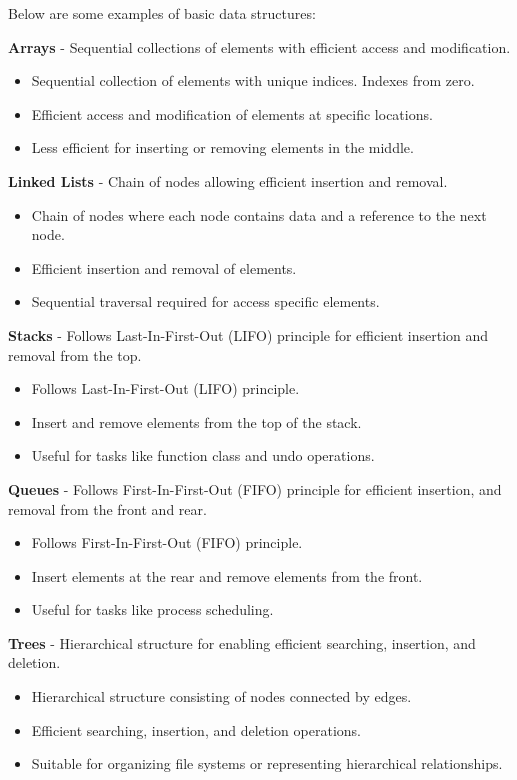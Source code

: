 \begin{solution}
    Below are some examples of basic data structures:

    \textbf{Arrays} - Sequential collections of elements with efficient access and modification.
    \begin{itemize}
        \item Sequential collection of elements with unique indices. Indexes from zero.
        \item Efficient access and modification of elements at specific locations.
        \item Less efficient for inserting or removing elements in the middle.
    \end{itemize}

    \textbf{Linked Lists} - Chain of nodes allowing efficient insertion and removal.
    \begin{itemize}
        \item Chain of nodes where each node contains data and a reference to the next node.
        \item Efficient insertion and removal of elements.
        \item Sequential traversal required for access specific elements.
    \end{itemize}

    \textbf{Stacks} - Follows Last-In-First-Out (LIFO) principle for efficient insertion and removal from the top.
    \begin{itemize}
        \item Follows Last-In-First-Out (LIFO) principle.
        \item Insert and remove elements from the top of the stack.
        \item Useful for tasks like function class and undo operations.
    \end{itemize}

    \textbf{Queues} - Follows First-In-First-Out (FIFO) principle for efficient insertion, and removal from the front
    and rear.
    \begin{itemize}
        \item Follows First-In-First-Out (FIFO) principle.
        \item Insert elements at the rear and remove elements from the front.
        \item Useful for tasks like process scheduling.
    \end{itemize}

    \textbf{Trees} - Hierarchical structure for enabling efficient searching, insertion, and deletion.
    \begin{itemize}
        \item Hierarchical structure consisting of nodes connected by edges.
        \item Efficient searching, insertion, and deletion operations.
        \item Suitable for organizing file systems or representing hierarchical relationships.
    \end{itemize}


\end{solution}
